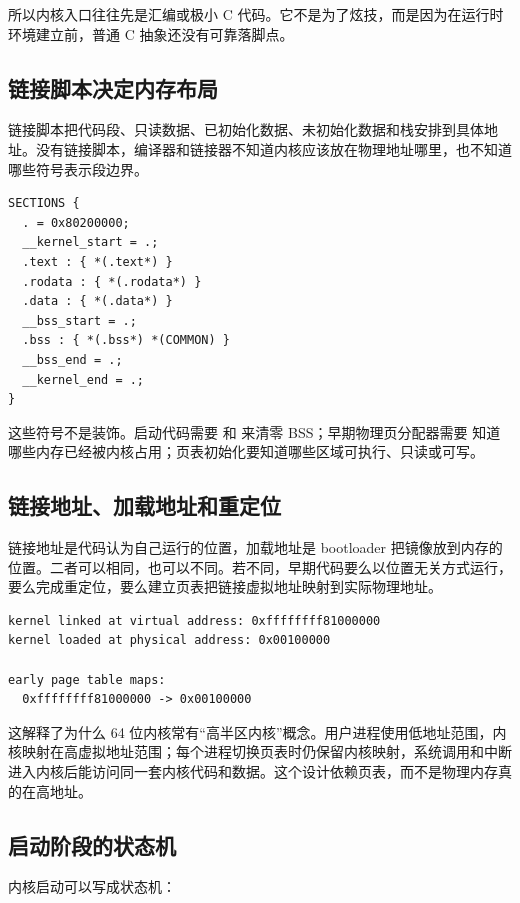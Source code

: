 所以内核入口往往先是汇编或极小 C 代码。它不是为了炫技，而是因为在运行时环境建立前，普通 C 抽象还没有可靠落脚点。

\subsection{链接脚本决定内存布局}

链接脚本把代码段、只读数据、已初始化数据、未初始化数据和栈安排到具体地址。没有链接脚本，编译器和链接器不知道内核应该放在物理地址哪里，也不知道哪些符号表示段边界。

\begin{lstlisting}
SECTIONS {
  . = 0x80200000;
  __kernel_start = .;
  .text : { *(.text*) }
  .rodata : { *(.rodata*) }
  .data : { *(.data*) }
  __bss_start = .;
  .bss : { *(.bss*) *(COMMON) }
  __bss_end = .;
  __kernel_end = .;
}
\end{lstlisting}

这些符号不是装饰。启动代码需要  和  来清零 BSS；早期物理页分配器需要  知道哪些内存已经被内核占用；页表初始化要知道哪些区域可执行、只读或可写。

\subsection{链接地址、加载地址和重定位}

链接地址是代码认为自己运行的位置，加载地址是 bootloader 把镜像放到内存的位置。二者可以相同，也可以不同。若不同，早期代码要么以位置无关方式运行，要么完成重定位，要么建立页表把链接虚拟地址映射到实际物理地址。

\begin{lstlisting}
kernel linked at virtual address: 0xffffffff81000000
kernel loaded at physical address: 0x00100000

early page table maps:
  0xffffffff81000000 -> 0x00100000
\end{lstlisting}

这解释了为什么 64 位内核常有“高半区内核”概念。用户进程使用低地址范围，内核映射在高虚拟地址范围；每个进程切换页表时仍保留内核映射，系统调用和中断进入内核后能访问同一套内核代码和数据。这个设计依赖页表，而不是物理内存真的在高地址。

\subsection{启动阶段的状态机}

内核启动可以写成状态机：

